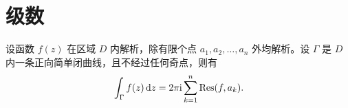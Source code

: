 \chapter{级数}
\begin{theorem}[留数定理]
    设函数 \(f(z)\) 在区域 \(D\) 内解析，除有限个点 \(a_1, a_2, \ldots, a_n\) 外均解析。设
    \(\Gamma\) 是 \(D\) 内一条正向简单闭曲线，且不经过任何奇点，则有
    \[
        \int_{\Gamma} f(z) \d{z} = 2 \pi \i \sum_{k=1}^n \Res(f, a_k).
    \]
\end{theorem}